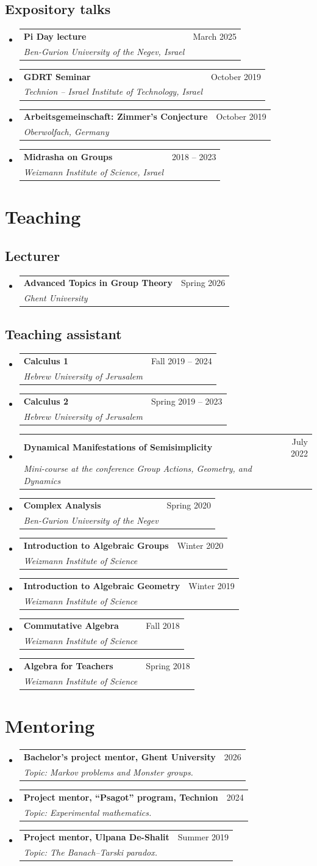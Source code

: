 \documentclass[letterpaper,11pt]{article}
\makeatletter
\newcommand{\resumeSubheading}[4]{
  \vspace{-3pt}\item
    \begin{tabular*}{0.97\textwidth}[t]{l@{\extracolsep{\fill}}r}
      \textbf{#1} & #2 \\
      \textit{\small #3} & \textit{\small #4} \\
    \end{tabular*}\vspace{-10pt}
}
\newcommand{\resumeSubHeadingListStart}{\begin{itemize}[leftmargin=0.15in, label={}]}
\newcommand{\resumeSubHeadingListEnd}{\end{itemize}}
\makeatother
\begin{document}
\subsection{Expository talks}
\resumeSubHeadingListStart
    \resumeSubheading
    {Pi Day lecture}{March 2025}
    {Ben-Gurion University of the Negev, Israel}{}
    \resumeSubheading
    {GDRT Seminar}{October 2019}
    {Technion -- Israel Institute of Technology, Israel}{}
    \resumeSubheading
    {Arbeitsgemeinschaft: Zimmer's Conjecture}{October 2019}
    {Oberwolfach, Germany}{}
    \resumeSubheading
    {Midrasha on Groups}{2018 -- 2023}
    {Weizmann Institute of Science, Israel}{}
\resumeSubHeadingListEnd


\section{Teaching}
\subsection{Lecturer}
\resumeSubHeadingListStart
    \resumeSubheading
    {Advanced Topics in Group Theory}{Spring 2026}
    {Ghent University}{}
\resumeSubHeadingListEnd

\subsection{Teaching assistant}
\resumeSubHeadingListStart
    \resumeSubheading
    {Calculus 1}{Fall 2019 -- 2024}
    {Hebrew University of Jerusalem}{}
    \resumeSubheading
    {Calculus 2}{Spring 2019 -- 2023}
    {Hebrew University of Jerusalem}{}
    \resumeSubheading
    {Dynamical Manifestations of Semisimplicity}{July 2022}
    {Mini-course at the conference Group Actions, Geometry, and Dynamics}{}
    \resumeSubheading
    {Complex Analysis}{Spring 2020}
    {Ben-Gurion University of the Negev}{}
    \resumeSubheading
    {Introduction to Algebraic Groups}{Winter 2020}
    {Weizmann Institute of Science}{}
    \resumeSubheading
    {Introduction to Algebraic Geometry}{Winter 2019}
    {Weizmann Institute of Science}{}
    \resumeSubheading
    {Commutative Algebra}{Fall 2018}
    {Weizmann Institute of Science}{}
    \resumeSubheading
    {Algebra for Teachers}{Spring 2018}
    {Weizmann Institute of Science}{}
\resumeSubHeadingListEnd


\section{Mentoring}
\resumeSubHeadingListStart
    \resumeSubheading
        {Bachelor's project mentor, Ghent University}{2026}
        {Topic: Markov problems and Monster groups.}{}
    \resumeSubheading
        {Project mentor, ``Psagot'' program, Technion}{2024}
        {Topic: Experimental mathematics.}{}
    \resumeSubheading
        {Project mentor, Ulpana De-Shalit}{Summer 2019}
        {Topic: The Banach--Tarski paradox.}{}
\resumeSubHeadingListEnd
\end{document}
